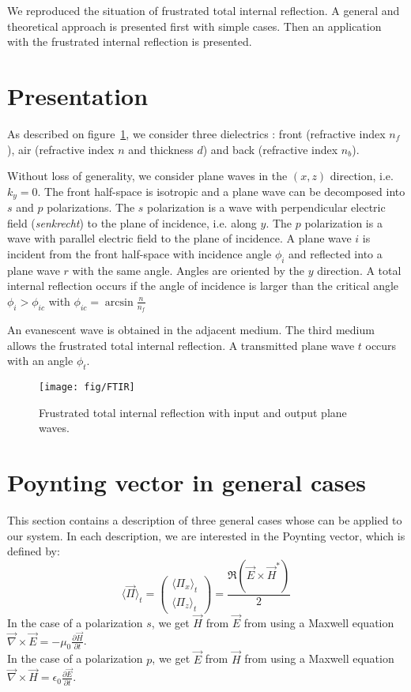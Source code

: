 


We reproduced the situation of frustrated total internal reflection. A general and theoretical approach is presented first with simple cases. Then an application with the frustrated internal reflection is presented.


\section{Presentation}

As described on figure~\ref{fig:FTIR}, we consider three dielectrics : front (refractive index $n_f$), air (refractive index $n$ and thickness $d$) and back (refractive index $n_b$).

Without loss of generality, we consider plane waves in the $(x,z)$ direction, i.e. $k_y=0$. The front half-space is isotropic and a plane wave can be decomposed into $s$ and $p$ polarizations.
The $s$ polarization is a wave with perpendicular electric field (\emph{senkrecht}) to the plane of incidence, i.e. along $y$.
The $p$ polarization is a wave with parallel electric field to the plane of incidence.
A plane wave $i$ is incident from the front half-space with incidence angle $\phi_i$ and reflected into a plane wave $r$ with the same angle. Angles are oriented by the $y$ direction. 
A total internal reflection occurs if the angle of incidence is larger than the critical angle
$\phi_i > \phi_{ic}$ with $\phi_{ic}=\arcsin\displaystyle\frac{n}{n_f}$

An evanescent wave is obtained in the adjacent medium. The third medium allows the frustrated total internal reflection. A transmitted plane wave $t$ occurs with an angle $\phi_t$.

\begin{figure}[!h]
\texttt{[image: fig/FTIR]}
\caption{\label{fig:FTIR}Frustrated total internal reflection with input and output plane waves. }
\end{figure}
 
\section{Poynting vector in general cases}
This section contains a description of three general cases whose can be applied to our system. In each description, we are interested in the Poynting vector, which is defined by:
$$\langle \vec{\Pi} \rangle _t = \begin{pmatrix}
\langle \Pi _x \rangle _t\\
\langle \Pi _z \rangle _t
\end{pmatrix}
=\frac{\Re(\vec{E}\times \vec{H}^*)}{2} $$
In the case of a polarization $s$, we get $\vec{H}$ from $\vec{E}$ from using a Maxwell equation
$\vec{\nabla}\times\vec{E} = -\mu_0 \frac{\partial\vec{H}}{\partial t}$.\\
In the case of a polarization $p$, we get $\vec{E}$ from $\vec{H}$ from using a Maxwell equation $\vec{\nabla}\times\vec{H}=\epsilon_0\frac{\partial\vec{E}}{\partial t}$.\\

